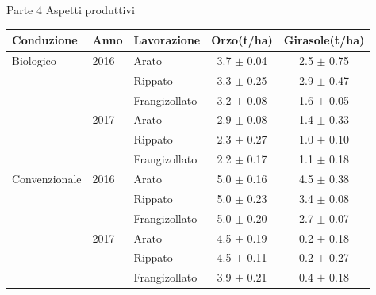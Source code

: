 \documentclass[10pt]{beamer}
\begin{document}
\begin{frame}{Parte 4 \small{Aspetti produttivi}}

  \vspace{0.5cm}
  \footnotesize{
    \begin{table}[ht]
      \centering
      \begin{tabular}{lllcc}
        \hline
        Conduzione   & Anno & Lavorazione   & Orzo(t/ha)      & Girasole(t/ha) \\ 
        \hline
        Biologico    & 2016 & Arato         & 3.7 $\pm$ 0.04  & 2.5 $\pm$ 0.75 \\ 
                     &      & Rippato       & 3.3 $\pm$ 0.25  & 2.9 $\pm$ 0.47 \\ 
                     &      & Frangizollato & 3.2 $\pm$ 0.08  & 1.6 $\pm$ 0.05 \\ 
                     & 2017 & Arato         & 2.9 $\pm$ 0.08  & 1.4 $\pm$ 0.33 \\ 
                     &      & Rippato       & 2.3 $\pm$ 0.27  & 1.0 $\pm$ 0.10 \\ 
                     &      & Frangizollato & 2.2 $\pm$ 0.17  & 1.1 $\pm$ 0.18 \\ 
        Convenzionale& 2016 & Arato         & 5.0 $\pm$ 0.16  & 4.5 $\pm$ 0.38 \\ 
                     &      & Rippato       & 5.0 $\pm$ 0.23  & 3.4 $\pm$ 0.08 \\ 
                     &      & Frangizollato & 5.0 $\pm$ 0.20  & 2.7 $\pm$ 0.07 \\ 
                     & 2017 & Arato         & 4.5 $\pm$ 0.19  & 0.2 $\pm$ 0.18 \\ 
                     &      & Rippato       & 4.5 $\pm$ 0.11  & 0.2 $\pm$ 0.27 \\ 
                     &      & Frangizollato & 3.9 $\pm$ 0.21  & 0.4 $\pm$ 0.18 \\ 
        \hline
      \end{tabular}
    \end{table}}



\end{frame}



\begin{frame}
\end{frame}

\appendix


\end{document}
